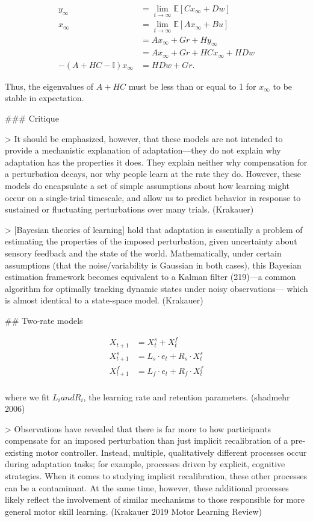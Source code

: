 \documentclass[../main.tex]{subfiles}
\begin{document}
{{{$$
\begin{aligned}
y_\infty &= \lim_{t\to\infty}\mathbb{E}\left[Cx_\infty + Dw\right] \\
x_\infty &= \lim_{t\to\infty}\mathbb{E}\left[Ax_\infty + Bu\right] \\
&= Ax_\infty + Gr + Hy_\infty \\
&= Ax_\infty + Gr + HCx_\infty + HDw \\
-(A + HC - \mathbb{I})x_\infty &= HDw + Gr.
\end{aligned}
$$

Thus, the
eigenvalues of $A + HC$ must be less than or equal to 1 for $x_\infty$
to be stable in expectation.

### Critique

> It should be emphasized, however, that these models are not intended to provide a mechanistic explanation of adaptation—they do not explain why adaptation has the properties it does. They explain neither why compensation for a perturbation decays, nor why people learn at the rate they do. However, these models do encapsulate a set of simple assumptions about how learning might occur on a single-trial timescale, and allow us to predict behavior in response to sustained or fluctuating perturbations over many trials. (Krakauer)

> [Bayesian theories of learning] hold that adaptation is essentially a problem of estimating the properties of the imposed perturbation, given uncertainty about sensory feedback and the state of the world. Mathematically, under certain assumptions (that the noise/variability is Gaussian in both cases), this Bayesian estimation framework becomes equivalent to a Kalman filter (219)—a common algorithm for optimally tracking dynamic states under noisy observations— which is almost identical to a state-space model. (Krakauer)


## Two-rate models

$$
\begin{aligned}
X_{t+1} &= X^{s}_{t} + X^f_t \\
X^s_{t+1} &= L_s \cdot e_t + R_s \cdot X^s_{t} \\
X^f_{t+1} &= L_f \cdot e_t + R_f \cdot X^f_{t} \\
\end{aligned}
$$

where we fit $L_i and R_i$, the learning rate and retention parameters. (shadmehr 2006)

> Observations have revealed that there is far more to how participants compensate for an imposed perturbation than just implicit recalibration of a pre-existing motor controller. Instead, multiple, qualitatively different processes occur during adaptation tasks; for example, processes driven by explicit, cognitive strategies. When it comes to studying implicit recalibration, these other processes can be a contaminant. At the same time, however, these additional processes likely reflect the involvement of similar mechanisms to those responsible for more general motor skill learning. (Krakauer 2019 Motor Learning Review)

}}}
\end{document}
